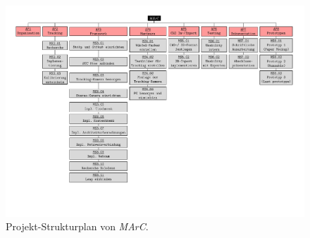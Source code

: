 \begin{figure}[htbp]
	\centering
	\includegraphics[angle=90,scale=.8, trim=1cm 1cm 1cm 0cm, clip]{kapitel/anhang/MP_Strukturplan.pdf}
	 \caption[Projekt-Strukturplan von \textit{MArC}]{Projekt-Strukturplan von \textit{MArC}.}
	\label{fig:psp}
\end{figure}
\newpage




